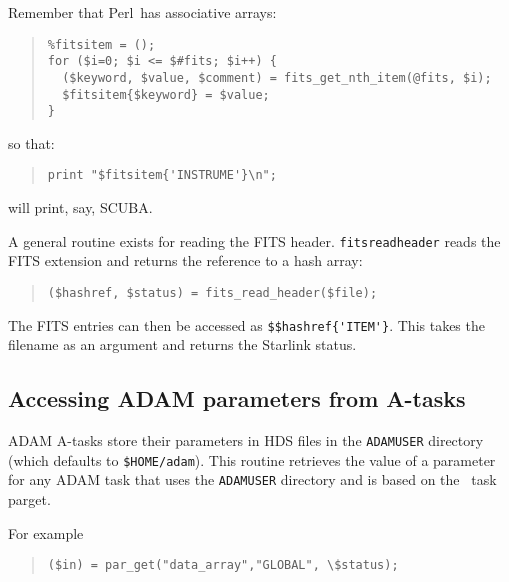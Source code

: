 \documentclass[twoside,11pt]{article}
\newenvironment{myquote}{\begin{quote}\begin{small}}{\end{small}\end{quote}}
\newcommand{\task}[1]{{\sf #1}}
\newcommand{\Kappa}{\xref{{\sc{Kappa}}}{sun95}{}}
\newcommand{\perl}{\xref{\textsf{Perl}}{sun193}{}}
\newcommand{\parget}{\xref{\task{parget}}{sun95}{PARGET}}
\newcommand{\xref}[3]{#1}
\newcommand{\xlabel}[1]{}
\renewcommand{\_}{\texttt{\symbol{95}}}
\begin{document}
Remember that \perl\ has associative arrays:

\begin{myquote}
\begin{verbatim}
%fitsitem = ();
for ($i=0; $i <= $#fits; $i++) {
  ($keyword, $value, $comment) = fits_get_nth_item(@fits, $i);
  $fitsitem{$keyword} = $value;
}
\end{verbatim}
\end{myquote}

so that:

\begin{myquote}
\begin{verbatim}
print "$fitsitem{'INSTRUME'}\n";
\end{verbatim}
\end{myquote}

will print, say, SCUBA.

A general routine exists for reading the FITS header.
\texttt{fits\_read\_header} reads the FITS extension and returns the
reference to a hash array:

\begin{myquote}
\begin{verbatim}
($hashref, $status) = fits_read_header($file);
\end{verbatim}
\end{myquote}

The FITS entries can then be accessed as \verb+$$hashref{'ITEM'}+.
This takes the filename as an argument and returns the Starlink status.

\subsection{\xlabel{accessing_adam_parameters_from_atasks}Accessing ADAM parameters from A-tasks}%
\label{accessing_adam_parameters_from_atasks}

ADAM A-tasks store their parameters in HDS files in the \texttt{ADAM\_USER}
directory (which defaults to \texttt{\$HOME/adam}). This routine retrieves the
value of a parameter for any ADAM task that uses the \texttt{ADAM\_USER}
directory and is based on the \Kappa\ task \parget.

For example
\begin{myquote}
\begin{verbatim}
($in) = par_get("data_array","GLOBAL", \$status);
\end{verbatim}
\end{myquote}
\end{document}
